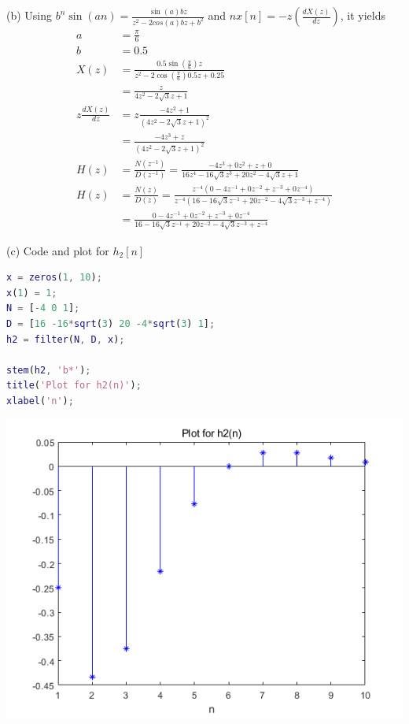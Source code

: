 \documentclass{article}
\begin{document}
(b) Using $b^{n}\sin(an) = \frac{\sin(a)bz}{z^{2}-2cos(a)bz+b^{2}}$ and $nx[n]=-z(\frac{dX(z)}{dz})$, it yields
\begin{align*}
a &= \frac{\pi}{6} \\
b &= 0.5 \\
X(z) &= \frac{0.5 \sin(\frac{\pi}{6})z}{z^{2}-2 \cos(\frac{\pi}{6}) 0.5z + 0.25} \\
&= \frac{z}{4z^2-2 \sqrt{3}z+1} \\
z\frac{dX(z)}{dz} &= z\frac{-4z^{2}+1}{(4z^{2}-2 \sqrt{3}z+1)^{2}} \\
&= \frac{-4z^{3}+z}{(4z^{2}-2 \sqrt{3}z+1)^{2}} \\
H(z) &= \frac{N(z^{-1})}{D(z^{-1})} = \frac{-4z^{3}+0z^{2}+z+0}{16z^{4}-16\sqrt{3}z^{3}+20z^{2}-4\sqrt{3}z+1} \\
H(z) &= \frac{N(z)}{D(z)} = \frac{z^{-4}(0-4z^{-1}+0z^{-2}+z^{-3}+0z^{-4})}{z^{-4}(16-16\sqrt{3}z^{-1}+20z^{-2}-4\sqrt{3}z^{-3}+z^{-4})} \\
&= \frac{0-4z^{-1}+0z^{-2}+z^{-3}+0z^{-4}}{16-16\sqrt{3}z^{-1}+20z^{-2}-4\sqrt{3}z^{-3}+z^{-4}}
\end{align*}

(c) Code and plot for $h_2[n]$
\begin{lstlisting}[language=Matlab]
x = zeros(1, 10);
x(1) = 1;
N = [-4 0 1];
D = [16 -16*sqrt(3) 20 -4*sqrt(3) 1];
h2 = filter(N, D, x);

stem(h2, 'b*');
title('Plot for h2(n)');
xlabel('n');
\end{lstlisting}

\includegraphics[width=\textwidth]{QuestionOneC.png}
\end{document}
